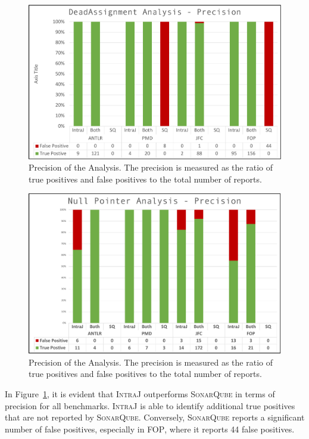 \begin{figure}[H]
  \includegraphics[width=1\linewidth]{kappa/img/DAAPrecision.pdf}
  \caption{\label{fig:DAAPrecisino}Precision of the  Analysis.
  The precision is measured as the ratio of true positives and false positives to the total number of reports.}
\end{figure}

\begin{figure}[H]
  \includegraphics[width=1\linewidth]{kappa/img/NPAPrecision.pdf}
  \caption{\label{fig:NPAPrecision}Precision of the  Analysis.
  The precision is measured as the ratio of true positives and false positives to the total number of reports.}
\end{figure}


In Figure~\ref{fig:DAAPrecisino}, it is evident that \textsc{IntraJ} outperforms 
\textsc{SonarQube} in terms of precision for all benchmarks. 
\textsc{IntraJ} is able to 
identify additional true positives that are not reported by \textsc{SonarQube}.
Conversely, \textsc{SonarQube} reports a significant number of false positives,
especially in \textsc{FOP}, where it reports 44 false positives.

